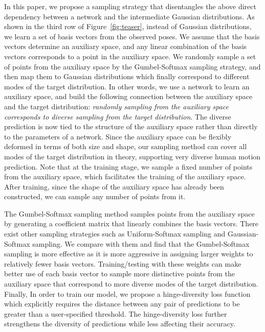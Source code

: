 \documentclass[sigconf,screen,nonacm]{acmart}
\begin{document}
	In this paper, we propose a sampling strategy that disentangles the above direct dependency between a network and the intermediate Gaussian distributions. As shown in the third row of Figure~\ref{fig:teaser}, instead of Gaussian distributions, we learn a set of basis vectors from the observed poses. We assume that the basis vectors determine an auxiliary space, and any linear combination of the basis vectors corresponds to a point in the auxiliary space. We randomly sample a set of points from the auxiliary space by the Gumbel-Softmax sampling strategy, and then map them to Gaussian distributions which finally correspond to different modes of the target distribution. In other words, we use a network to learn an auxiliary space, and build the following connection between the auxiliary space and the target distribution: \textit{randomly sampling from the auxiliary space corresponds to diverse sampling from the target distribution}. The diverse prediction is now tied to the structure of the auxiliary space rather than directly to the parameters of a network. Since the auxiliary space can be flexibly deformed in terms of both size and shape, our sampling method can cover all modes of the target distribution in theory, supporting very diverse human motion prediction. Note that at the training stage, we sample a fixed number of points from the auxiliary space, which facilitates the training of the auxiliary space. After training, since the shape of the auxiliary space has already been constructed, we can sample any number of points from it.
	
	The Gumbel-Softmax sampling method samples points from the auxiliary space by generating a coefficient matrix that linearly combines the basis vectors. There exist other sampling strategies such as Uniform-Softmax sampling and Gaussian-Softmax sampling. We compare with them and find that the Gumbel-Softmax sampling is more effective as it is more aggressive in assigning larger weights to relatively fewer basis vectors. Training/testing with these weights can make better use of each basis vector to sample more distinctive points from the auxiliary space that correspond to more diverse modes of the target distribution. Finally, In order to train our model, we propose a hinge-diversity loss function which explicitly requires the distance between any pair of predictions to be greater than a user-specified threshold. The hinge-diversity loss further strengthens the diversity of predictions while less affecting their accuracy.
	
\end{document}
